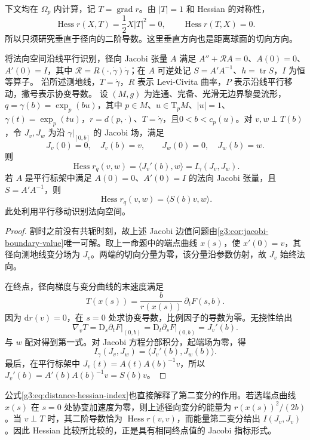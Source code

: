 下文均在 \(\Omega_p\) 内计算，记 \(T=\operatorname{grad}r\)。由 \(|T|=1\) 和 Hessian 的对称性，
\[
	\operatorname{Hess}r(X,T)=\frac12X|T|^2=0,
	\qquad \operatorname{Hess}r(T,X)=0.
\]
所以只须研究垂直于径向的二阶导数。这里垂直方向也是距离球面的切向方向。

\begin{proposition}\label{g3:prop:distance-hessian-jacobi}
	将法向空间沿线平行识别，径向 Jacobi 张量 \(A\) 满足 \(A''+\mathcal RA=0\)、\(A(0)=0\)、\(A'(0)=I\)，其中 \(\mathcal R=R(\cdot,\dot\gamma)\dot\gamma\)；在 \(A\) 可逆处记 \(S=A'A^{-1}\)、\(h=\operatorname{tr}S\)，\(I\) 为恒等算子。
	沿所述测地线，\(T=\dot\gamma\)，\(R\) 表示 Levi-Civita 曲率，\(P\) 表示沿线平行移动，撇号表示协变导数。
	设 \((M,g)\) 为连通、完备、光滑无边界黎曼流形，\(q=\gamma(b)=\exp_p(bu)\)，其中 \(p\in M\)、\(u\in\mathrm T_pM\)、\(|u|=1\)、\(\gamma(t)=\exp_p(tu)\)，\(r=d(p,\cdot)\)、\(T=\dot\gamma\)，且\(0<b<c_p(u)\)。对 \(v,w\perp T(b)\)，令 \(J_v,J_w\) 为沿 \(\gamma|_{[0,b]}\) 的 Jacobi 场，满足
	\[
		J_v(0)=0,\quad J_v(b)=v,\qquad
		J_w(0)=0,\quad J_w(b)=w.
	\]
	则
	\begin{equation}\label{g3:eq:distance-hessian-index}
		\operatorname{Hess}r_q(v,w)
		=\langle J_v'(b),w\rangle
		=I_\gamma(J_v,J_w).
	\end{equation}
	若 \(A\) 是平行标架中满足 \(A(0)=0\)、\(A'(0)=I\) 的法向 Jacobi 张量，且 \(S=A'A^{-1}\)，则
	\[
		\operatorname{Hess}r_q(v,w)=\langle S(b)v,w\rangle.
	\]
	此处利用平行移动识别法向空间。
\end{proposition}
\begin{proof}
	割时之前没有共轭时刻，故上述 Jacobi 边值问题由\cref{g3:cor:jacobi-boundary-value}唯一可解。取上一命题中的端点曲线 \(x(s)\)，使 \(x'(0)=v\)，其径向测地线变分场为 \(J_v\)。两端的切向分量为零，该分量沿参数仿射，故 \(J_v\) 始终法向。

	在终点，径向梯度与变分曲线的末速度满足
	\[
		T(x(s))=\frac b{r(x(s))}\,\partial_tF(s,b).
	\]
	因为 \(\mathrm dr(v)=0\)，在 \(s=0\) 处求协变导数，比例因子的导数为零。无挠性给出
	\[
		\nabla_vT
		=\left.\mathrm D_s\partial_tF\right|_{(0,b)}
		=\left.\mathrm D_t\partial_sF\right|_{(0,b)}
		=J_v'(b).
	\]
	与 \(w\) 配对得到第一式。对 Jacobi 方程分部积分，起端场为零，得
	\[
		I_\gamma(J_v,J_w)
		=\langle J_v'(b),J_w(b)\rangle.
	\]
	最后，在平行标架中 \(J_v(t)=A(t)A(b)^{-1}v\)，所以
	\(J_v'(b)=A'(b)A(b)^{-1}v=S(b)v\)。
\end{proof}

公式\eqref{g3:eq:distance-hessian-index}也直接解释了第二变分的作用。若选端点曲线 \(x(s)\) 在 \(s=0\) 处协变加速度为零，则上述径向变分的能量为 \(r(x(s))^2/(2b)\)。当 \(v\perp T\) 时，其二阶导数恰为 \(\operatorname{Hess}r(v,v)\)，而能量第二变分给出 \(I(J_v,J_v)\)。因此 Hessian 比较所比较的，正是具有相同终点值的 Jacobi 指标形式。

